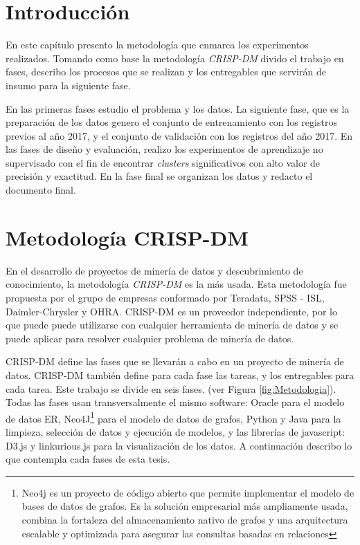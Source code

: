 \section{Introducción}
En este capítulo presento la metodología que enmarca los experimentos realizados. Tomando como base la metodología \textit{\acrfull{CRISP-DM}} divido el trabajo en fases, describo los procesos que se realizan y los entregables que servirán de insumo para la siguiente fase.

En las primeras fases estudio el problema y los datos. La siguiente fase, que es la preparación de los datos genero el conjunto de entrenamiento con los registros previos al año 2017, y el conjunto de validación con los registros del año 2017. En las fases de diseño y evaluación, realizo los experimentos de aprendizaje no supervisado con el fin de encontrar \textit{clusters} significativos con alto valor de precisión y exactitud. En la fase final se organizan los datos y  redacto el documento final.

\section{Metodología CRISP-DM}
En el desarrollo de proyectos de minería de datos y descubrimiento de conocimiento, la metodología \textit{\acrfull{CRISP-DM}} es la más usada. Esta metodología fue propuesta por el grupo de empresas conformado por Teradata,
SPSS - ISL, Daimler-Chrysler y OHRA. \acrshort{CRISP-DM} es un proveedor independiente, por lo que puede
puede utilizarse con cualquier herramienta de minería de datos y se puede aplicar para resolver cualquier problema de minería de datos.\cite{Marbn2009AModel}

\acrshort{CRISP-DM} define las fases que se llevarán a cabo en un proyecto de minería de datos. \acrshort{CRISP-DM} también define para cada fase las tareas, y los entregables para cada tarea. Este trabajo se divide en seis fases.
(ver Figura \ref{fig:Metodologia}). Todas las fases usan transversalmente el mismo software: Oracle para el modelo de datos ER, Neo4J\footnote{Neo4j es un proyecto de código abierto que permite implementar el modelo de bases de datos de grafos. Es la solución empresarial más ampliamente usada, combina la fortaleza del almacenamiento nativo de grafos y una arquitectura escalable y optimizada para asegurar las consultas basadas en relaciones} para el modelo de datos de grafos, Python y Java para la limpieza, selección de datos y ejecución de modelos, y las librerías de javascript: D3.js y linkurious.js para la visualización de los datos. 
A continuación describo lo que contempla cada fases de esta tesis.

